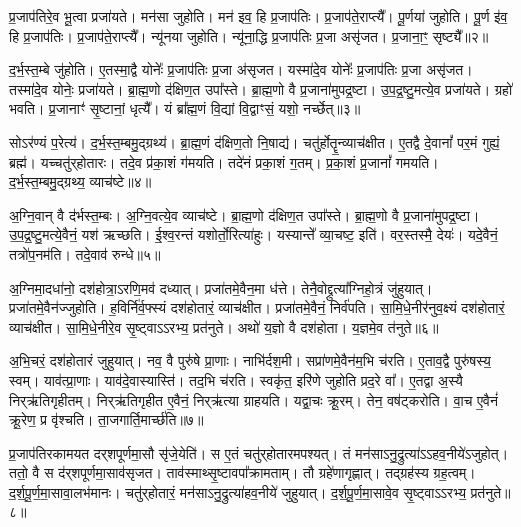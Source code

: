 प्र॒जा\-प॑तिरे॒व भू॒त्वा प्रजा॑यते।
मन॑सा जुहोति।
मन॑ इव॒ हि प्र॒जा\-प॑तिः।
प्र॒जा\-प॑ते॒राप्त्यै᳚।
पू॒र्णया॑ जुहोति।
पू॒र्ण इ॑व॒ हि प्र॒जा\-प॑तिः।
प्र॒जा\-प॑ते॒राप्त्यै᳚।
न्यू॑नया जुहोति।
न्यू॑ना॒द्धि प्र॒जा\-प॑तिः प्र॒जा असृ॑जत।
प्र॒जाना॒ꣳ॒ सृष्ट्यै᳚॥२॥

द॒र्भ॒स्त॒म्बे जु॑होति।
ए॒तस्मा॒द्वै योनेः᳚ प्र॒जा\-प॑तिः प्र॒जा अ॑\-सृजत।
यस्मा॑दे॒व योनेः᳚ प्र॒जा\-प॑तिः प्र॒जा असृ॑जत।
तस्मा॑दे॒व योनेः॒ प्रजा॑यते।
ब्रा॒ह्म॒णो द॑क्षिण॒त उपा᳚स्ते।
ब्रा॒ह्म॒णो वै प्र॒जाना॑मुपद्र॒ष्टा।
उ॒प॒द्र॒ष्टु॒मत्ये॒व प्रजा॑यते।
ग्रहो॑ भवति।
प्र॒जानाꣳ॑ सृ॒ष्टानां॒ धृत्यै᳚।
यं ब्रा᳚ह्म॒णं वि॒द्यां वि॒द्वाꣳसं॒ यशो॒ नर्च्छेत्॥३॥

सोऽर॑ण्यं प॒रेत्य॑।
द॒र्भ॒स्त॒म्बमु॒द्ग्रथ्य॑।
ब्रा॒ह्म॒णं द॑क्षिण॒तो नि॒षाद्य॑।
चतु॑र्\mbox{}होतॄ॒न्व्याच॑क्षीत।
ए॒तद्वै दे॒वानां᳚ पर॒मं गुह्यं॒ ब्रह्म॑।
यच्चतु॑र्‌\mbox{}होतारः।
तदे॒व प्र॑का॒शं ग॑मयति।
तदे॑नं प्रका॒शं ग॒तम्।
प्र॒का॒शं प्र॒जानां᳚ गमयति।
द॒र्भ॒स्त॒म्बमु॒द्ग्रथ्य॒ व्याच॑ष्टे॥४॥

अ॒ग्नि॒वान् वै द॑र्भस्त॒म्बः।
अ॒ग्नि॒वत्ये॒व व्याच॑ष्टे।
ब्रा॒ह्म॒णो द॑क्षिण॒त उपा᳚स्ते।
ब्रा॒ह्म॒णो वै प्र॒जाना॑मुपद्र॒ष्टा।
उ॒प॒द्र॒ष्टु॒मत्ये॒वैनं॒ यश॑ ऋच्छति।
ई॒श्व॒रन्तं यशोर्तो॒रित्या॑हुः।
यस्यान्ते᳚ व्या॒चष्ट॒ इति॑।
वर॒स्तस्मै॒ देयः॑।
यदे॒वैनं॒ तत्रो॑प॒नम॑ति।
तदे॒वाव॑ रुन्धे॥५॥

अ॒ग्निमा॒दधा॑नो॒ दश॑होत्रा॒\-ऽरणि॒मव॑ दध्यात्।
प्रजा॑तमे॒वैन॒मा ध॑त्ते।
तेनै॒वोद्द्रुत्या᳚ग्निहो॒त्रं जु॑हुयात्।
प्रजा॑तमे॒वैन॑ज्जुहोति।
ह॒विर्नि॑र्व॒फ्स्यं दश॑होतारं॒ व्याच॑क्षीत।
प्रजा॑तमे॒वैनं॒ निर्व॑पति।
सा॒मि॒धे॒नीर॑नुव॒क्ष्यं दश॑होतारं॒ व्याच॑क्षीत।
सा॒मि॒धे॒नीरे॒व सृ॒ष्ट्वा\-ऽऽरभ्य॒ प्रत॑नुते।
अथो॑ य॒ज्ञो वै दश॑होता।
य॒ज्ञमे॒व त॑नुते॥६॥

अ॒भि॒चरं॒ दश॑होतारं जुहुयात्।
नव॒ वै पुरु॑षे प्रा॒णाः।
नाभि॑र्दश॒मी।
सप्रा॑णमे॒वैन॑म॒भि च॑रति।
ए॒ताव॒द्वै पुरु॑षस्य॒ स्वम्।
याव॑त्प्रा॒णाः।
याव॑दे॒वास्यास्ति॑।
तद॒भि च॑रति।
स्वकृ॑त॒ इरि॑णे जुहोति प्रद॒रे वा᳚।
ए॒तद्वा अ॒स्यै निर्‌\mbox{}ऋ॑तिगृहीतम्।
निर्‌\mbox{}ऋ॑तिगृहीत ए॒वैनं॒ निर्‌\mbox{}ऋ॑त्या ग्राहयति।
यद्वा॒चः क्रू॒रम्।
तेन॒ वष॑ट्करोति।
वा॒च ए॒वैनं॑ क्रू॒रेण॒ प्र वृ॑श्चति।
ता॒जगार्ति॒मार्च्छ॑ति॥७॥\anuvakamend[दश॑होता॒ सृष्ट्या॑ ऋ॒च्छेद्व्याच॑प्टे रुन्ध ए॒व त॑नुते॒ निर्‌\mbox{}ऋ॑तिगृहीतं॒ पञ्च॑ च]

प्र॒जा\-प॑तिरकामयत दर्‌\mbox{}शपूर्णमा॒सौ सृ॑जे॒येति॑।
स ए॒तं  चतु॑र्‌\mbox{}होतारमपश्यत्।
तं मन॑सा\-ऽनु॒द्रुत्या॑\-ऽऽहव॒नीये॑\-ऽजुहोत्।
ततो॒ वै स द॑र्‌\mbox{}शपूर्णमा॒साव॑\-सृजत।
ताव॑स्माथ्सृ॒ष्टावपा᳚\-क्रामताम्।
तौ ग्रहे॑णागृह्णात्।
तद्ग्रह॑स्य ग्रह॒त्वम्।
द॒र्श॒पू॒र्ण॒मा॒सावा॒लभ॑मानः।
चतु॑र्‌\mbox{}होतारं॒ मन॑सा\-ऽनु॒द्रुत्या॑\-हव॒नीये॑ जुहुयात्।
द॒र्श॒पू॒र्ण॒मा॒सावे॒व सृ॒ष्ट्वा\-ऽऽरभ्य॒ प्रत॑नुते॥८॥

